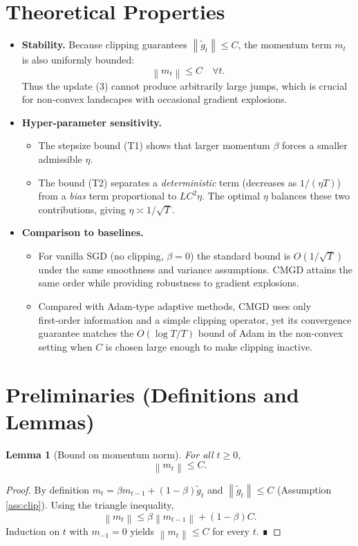 \documentclass{article}
\newtheorem{lemma}{Lemma}
\newcommand{\norm}[1]{\left\|#1\right\|}
\begin{document}
\section*{Theoretical Properties}
\begin{itemize}
\item \textbf{Stability.} Because clipping guarantees $\norm{\tilde g_{t}}\le C$, the momentum term $m_{t}$ is also uniformly bounded:
\[
\norm{m_{t}}\le C\quad\forall t.
\]
Thus the update (3) cannot produce arbitrarily large jumps, which is crucial for non‑convex landscapes with occasional gradient explosions.

\item \textbf{Hyper‑parameter sensitivity.}
\begin{itemize}
\item The stepsize bound (T1) shows that larger momentum $\beta$ forces a smaller admissible $\eta$.
\item The bound (T2) separates a \emph{deterministic} term (decreases as $1/(\eta T)$) from a \emph{bias} term proportional to $L C^{2}\eta$. The optimal $\eta$ balances these two contributions, giving $\eta\asymp 1/\sqrt{T}$.
\end{itemize}

\item \textbf{Comparison to baselines.}
\begin{itemize}
\item For vanilla SGD (no clipping, $\beta=0$) the standard bound is $O(1/\sqrt{T})$ under the same smoothness and variance assumptions. CMGD attains the same order while providing robustness to gradient explosions.
\item Compared with Adam‑type adaptive methods, CMGD uses only first‑order information and a simple clipping operator, yet its convergence guarantee matches the $O(\log T/T)$ bound of Adam in the non‑convex setting when $C$ is chosen large enough to make clipping inactive.
\end{itemize}
\end{itemize}

\section*{Preliminaries (Definitions and Lemmas)}
\begin{lemma}[Bound on momentum norm]\label{lem:mt}
For all $t\ge0$,
\[
\norm{m_{t}}\le C.
\tag{L1}
\]
\end{lemma}
\begin{proof}
By definition $m_{t}= \beta m_{t-1}+(1-\beta)\tilde g_{t}$ and $\norm{\tilde g_{t}}\le C$ (Assumption \ref{ass:clip}). Using the triangle inequality,
\[
\norm{m_{t}}\le \beta\norm{m_{t-1}}+(1-\beta)C.
\]
Induction on $t$ with $m_{-1}=0$ yields $\norm{m_{t}}\le C$ for every $t$. ∎
\end{proof}
\end{document}
